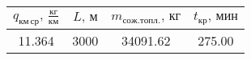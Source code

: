 \begin{tabular}{|c|c|c|c|}
\hline
$q_{км\, ср},\, \frac{кг}{км}$ & $L,\, м$ & $m_{сож. топл.},\, кг$ & $t_{кр},\, мин$ \\ 
\hline
11.364 & 3000 & 34091.62 & 275.00 \\ 
\hline
\end{tabular}